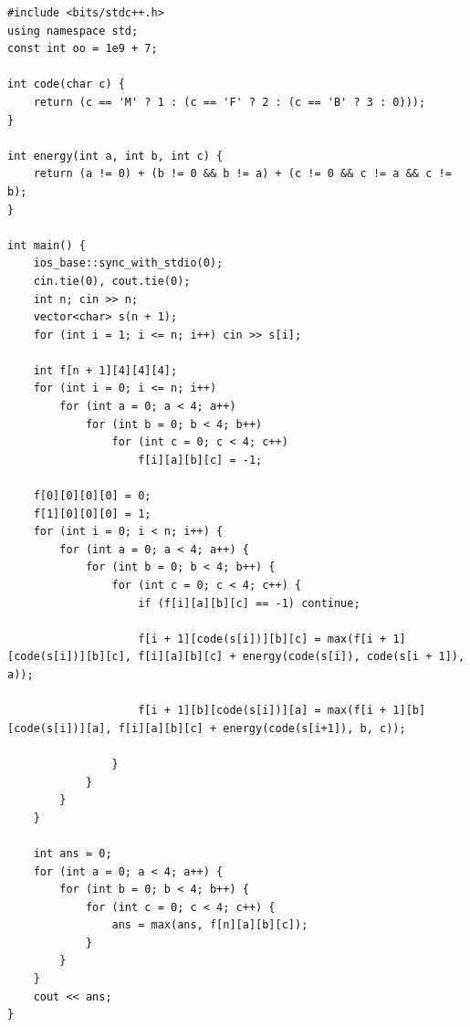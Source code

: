 \begin{lstlisting}[title=\centering\textbf{Cài đặt}]
#include <bits/stdc++.h>
using namespace std;
const int oo = 1e9 + 7;

int code(char c) {
    return (c == 'M' ? 1 : (c == 'F' ? 2 : (c == 'B' ? 3 : 0)));
}

int energy(int a, int b, int c) {
    return (a != 0) + (b != 0 && b != a) + (c != 0 && c != a && c != b);
}

int main() {
    ios_base::sync_with_stdio(0); 
    cin.tie(0), cout.tie(0);
    int n; cin >> n;
    vector<char> s(n + 1);
    for (int i = 1; i <= n; i++) cin >> s[i];

    int f[n + 1][4][4][4];
    for (int i = 0; i <= n; i++) 
        for (int a = 0; a < 4; a++)
            for (int b = 0; b < 4; b++) 
                for (int c = 0; c < 4; c++)
                    f[i][a][b][c] = -1;
                    
    f[0][0][0][0] = 0;
    f[1][0][0][0] = 1;  
    for (int i = 0; i < n; i++) {
        for (int a = 0; a < 4; a++) {
            for (int b = 0; b < 4; b++) {
                for (int c = 0; c < 4; c++) {
                    if (f[i][a][b][c] == -1) continue;

                    f[i + 1][code(s[i])][b][c] = max(f[i + 1][code(s[i])][b][c], f[i][a][b][c] + energy(code(s[i]), code(s[i + 1]), a));

                    f[i + 1][b][code(s[i])][a] = max(f[i + 1][b][code(s[i])][a], f[i][a][b][c] + energy(code(s[i+1]), b, c));

                }
            }
        }
    }

    int ans = 0;
    for (int a = 0; a < 4; a++) {
        for (int b = 0; b < 4; b++) {
            for (int c = 0; c < 4; c++) {
                ans = max(ans, f[n][a][b][c]);
            }
        }
    }
    cout << ans;
}
\end{lstlisting}
